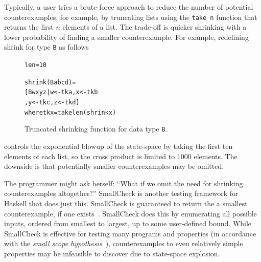 \documentclass[10pt]{sigplanconf}
\newenvironment{code}{\begin{alltt}}{\end{alltt}}
\newcommand{\ttp}[1]{\texttt{#1}}
\begin{document}
Typically, a user tries a brute-force approach to reduce the number of potential
counterexamples, for example, by truncating lists using the \ttp{take n} function
that returns the first $n$ elements of a list.  The trade-off is quicker
shrinking with a lower probability of finding a smaller counterexample.  For
example, redefining shrink for type \ttp{B} as follows
%


\begin{figure}[ht]
\begin{code}
len = 10

shrink (B a b c d) = 
  [ B w x y z | w <- tk a, x <- tk b
              , y <- tk c, z <- tk d ]
  where tk x = take len (shrink x)
\end{code}
  \caption{Truncated shrinking function for data type \ttp{B}.}
  \label{lst:newshrink}
\end{figure}

%
\noindent
controls the exponential blowup of the state-space by taking the first ten
elements of each list, so the cross product is limited to 1000 elements.  The
downside is that potentially smaller counterexamples may be omitted.

The programmer might ask herself: ``What if we omit the need for shrinking
counterexamples altogether?''  SmallCheck is another testing framework for
Haskell that does just this.  SmallCheck is guaranteed to return the a smallest
counterexample, if one exists~\cite{sc}.  SmallCheck does this by enumerating
all possible inputs, ordered from smallest to largest, up to some user-defined
bound.  While SmallCheck is effective for testing many programs and properties
(in accordance with the \emph{small scope hypothesis}~\cite{jackson}),
counterexamples to even relatively simple properties may be infeasible to
discover due to state-space explosion.
\end{document}
